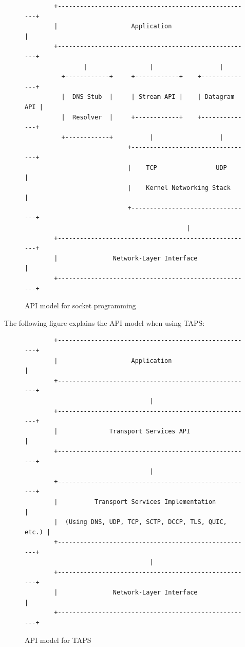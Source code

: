 \begin{figure}[H]
    \centering
    \begin{lstlisting}
        +-----------------------------------------------------+
        |                    Application                      |
        +-----------------------------------------------------+
                |                 |                  |
          +------------+     +------------+    +--------------+
          |  DNS Stub  |     | Stream API |    | Datagram API |
          |  Resolver  |     +------------+    +--------------+
          +------------+          |                  |
                            +---------------------------------+
                            |    TCP                UDP       |
                            |    Kernel Networking Stack      |
                            +---------------------------------+
                                            |
        +-----------------------------------------------------+
        |               Network-Layer Interface               |
        +-----------------------------------------------------+
    \end{lstlisting}
    \caption{API model for socket programming \cite{trammellAbstractApplicationProgramming2025}}
\end{figure}

The following figure explains the API model when using TAPS:

\begin{figure}[H]
    \centering
    \begin{lstlisting}
        +-----------------------------------------------------+
        |                    Application                      |
        +-----------------------------------------------------+
                                  |
        +-----------------------------------------------------+
        |              Transport Services API                 |
        +-----------------------------------------------------+
                                  |
        +-----------------------------------------------------+
        |          Transport Services Implementation          |
        |  (Using DNS, UDP, TCP, SCTP, DCCP, TLS, QUIC, etc.) |
        +-----------------------------------------------------+
                                  |
        +-----------------------------------------------------+
        |               Network-Layer Interface               |
        +-----------------------------------------------------+
    \end{lstlisting}
    \caption{API model for TAPS \cite{trammellAbstractApplicationProgramming2025}}
\end{figure}

